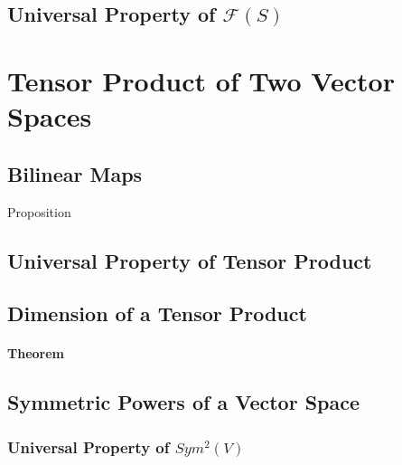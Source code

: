 \documentclass{article}
\begin{document}
\subsection{Universal Property of $\mathcal{F}(S)$ }
\section{Tensor Product of Two Vector Spaces }
\subsection{Bilinear Maps}
Proposition

\subsection{Universal Property of Tensor Product }

\subsection{Dimension of a Tensor Product}
\paragraph*{Theorem}

\subsection{Symmetric Powers of a Vector Space}
\subsubsection{Universal Property of $Sym^2(V)$}
\end{document}
